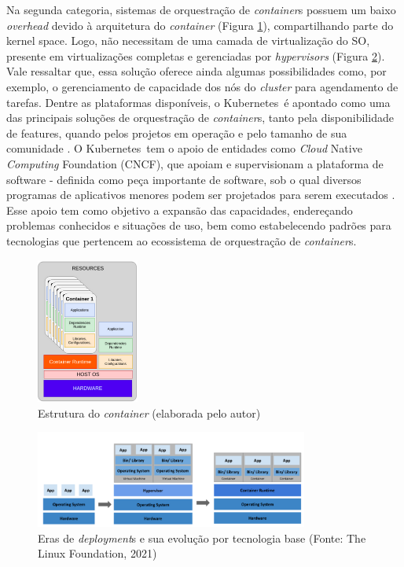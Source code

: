 Na segunda categoria, sistemas de orquestração de \emph{container}s possuem um baixo \emph{overhead} devido à arquitetura do \emph{container} (Figura \ref{fig:container}), compartilhando parte do kernel space. Logo, não necessitam de uma camada de virtualização do SO, presente em virtualizações completas e gerenciadas por \emph{hypervisors} (Figura \ref{fig:vmscontainer}). Vale ressaltar que, essa solução oferece ainda algumas possibilidades como, por exemplo,  o gerenciamento de capacidade dos nós do \emph{cluster} para agendamento de tarefas. Dentre as plataformas disponíveis, o Kubernetes\textregistered \ é apontado como uma das principais soluções de orquestração de \emph{container}s, tanto pela disponibilidade de features, quando pelos projetos em operação e pelo tamanho de sua comunidade \cite{truyen_comprehensive_2021}. O Kubernetes\textregistered \ tem o apoio de entidades como \emph{Cloud} Native \emph{Computing} Foundation (CNCF), que apoiam e supervisionam a plataforma de software -  definida como peça importante de software, sob o qual diversos programas de aplicativos menores podem ser projetados para serem executados \cite{collins2022}. Esse apoio tem como objetivo a expansão  das capacidades, endereçando problemas conhecidos e situações de uso, bem como estabelecendo padrões para tecnologias que pertencem ao ecossistema de orquestração de \emph{container}s.

\begin{figure}[!h]
    \centering
    \includegraphics[width=0.3\textwidth]{04-figuras/containers.png}
    \caption[Estrutura do \emph{container} ]{Estrutura do \emph{container} (elaborada pelo autor)}
    \label{fig:container}
\end{figure}

\begin{figure}[!h]
    \centering
    \includegraphics[width=0.8\textwidth]{04-figuras/vmsContainer.png}
    \caption[Eras de \emph{deployment}s e sua evolução por tecnologia base ]{Eras de \emph{deployment}s e sua evolução por tecnologia base (Fonte: The Linux Foundation\textregistered, 2021)}
    \label{fig:vmscontainer}
\end{figure}

